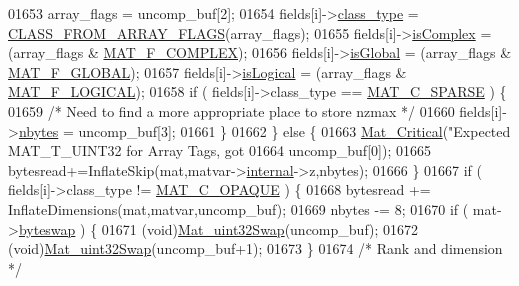 \begin{DoxyCode}
{{{{{{{{{{{{{01653                array\_flags = uncomp\_buf[2];
01654                fields[i]->\hyperlink{group___m_a_t_aff13035bf3265dd7d9425e5d40c839d4}{class\_type} = \hyperlink{mat5_8c_a85a616d27707e89bda9fd2e9bbb6a586}{CLASS\_FROM\_ARRAY\_FLAGS}(array\_flags);
01655                fields[i]->\hyperlink{group___m_a_t_aeb03b3a69f108dc05470b00443a43739}{isComplex}  = (array\_flags & \hyperlink{group___m_a_t_ggab9d6ef9e3ddca78a317b173f01d53fbbacd7b091a11184aad7fc6078c04470780}{MAT\_F\_COMPLEX});
01656                fields[i]->\hyperlink{group___m_a_t_af26c71c4c0ddb14931d15910dddac1bc}{isGlobal}   = (array\_flags & \hyperlink{group___m_a_t_ggab9d6ef9e3ddca78a317b173f01d53fbba49084e0c796aa7963e53f7539525d40d}{MAT\_F\_GLOBAL});
01657                fields[i]->\hyperlink{group___m_a_t_a866c1539e68073a837833d74cd4a65be}{isLogical}  = (array\_flags & \hyperlink{group___m_a_t_ggab9d6ef9e3ddca78a317b173f01d53fbba57eb5c6e200bcbc0f1b7982f29a169c2}{MAT\_F\_LOGICAL});
01658                \textcolor{keywordflow}{if} ( fields[i]->class\_type == \hyperlink{group___m_a_t_ggad4d60ae7b709fc81bfd744fb4c857c40a0d5655b7e6178a2242cb3bb56ff4c8d2}{MAT\_C\_SPARSE} ) \{
01659                    \textcolor{comment}{/* Need to find a more appropriate place to store nzmax */}
01660                    fields[i]->\hyperlink{group___m_a_t_abf1c844540503be2df9bb3db93cfe307}{nbytes} = uncomp\_buf[3];
01661                \}
01662             \} \textcolor{keywordflow}{else} \{
01663                 \hyperlink{group__mat__util_gaf51f2bfbb5580f575e4dd79757e2b80c}{Mat\_Critical}(\textcolor{stringliteral}{"Expected MAT\_T\_UINT32 for Array Tags, got %
01664                     uncomp\_buf[0]);
01665                 bytesread+=InflateSkip(mat,matvar->\hyperlink{group___m_a_t_a6e97e3ed9f40c49322c18561c2a94e92}{internal}->z,nbytes);
01666             \}
01667             \textcolor{keywordflow}{if} ( fields[i]->class\_type != \hyperlink{group___m_a_t_ggad4d60ae7b709fc81bfd744fb4c857c40ad83c684d250e463c1a3779647695c0c9}{MAT\_C\_OPAQUE} ) \{
01668                 bytesread += InflateDimensions(mat,matvar,uncomp\_buf);
01669                 nbytes -= 8;
01670                 \textcolor{keywordflow}{if} ( mat->\hyperlink{struct__mat__t_a99d207977af5e04941ace56d71817a40}{byteswap} ) \{
01671                     (void)\hyperlink{endian_8c_a8cb0d0750e2eaf9840d95db531934f4f}{Mat\_uint32Swap}(uncomp\_buf);
01672                     (void)\hyperlink{endian_8c_a8cb0d0750e2eaf9840d95db531934f4f}{Mat\_uint32Swap}(uncomp\_buf+1);
01673                 \}
01674                 \textcolor{comment}{/* Rank and dimension */}
}}}}}}}}}}}}}}
\end{DoxyCode}
